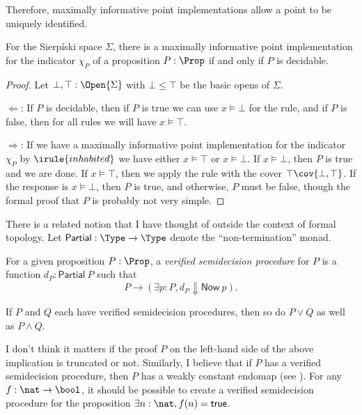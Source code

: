 Therefore, maximally informative point implementations allow a point to be uniquely identified.
\begin{theorem}
For the Sierpíski space $\Sigma$, there is a maximally informative point implementation for the indicator $\chi_P$ of a proposition $P : \Prop$ if and only if $P$ is decidable.
\end{theorem}
\begin{proof}
Let $\bot, \top : \Open{\Sigma}$ with $\bot \le \top$ be the basic opens of $\Sigma$. 

$\Longleftarrow$: If $P$ is decidable, then if $P$ is true we can use $x \models \bot$ for the  rule, and if $P$ is false, then for all rules we will have $x \models \top$.

$\Longrightarrow$: If we have a maximally informative point implementation for the indicator $\chi_P$ by $\irule{inhabited}$ we have either $x \models \top$ or $x \models \bot$. If $x \models \bot$, then $P$ is true and we are done. If $x \models \top$, then we apply the  rule with the cover $\top \cov \{ \bot, \top \}$. If the response is $x \models \bot$, then $P$ is true, and otherwise, $P$ must be false, though the formal proof that $P$ is probably not very simple.
\end{proof}

There is a related notion that I have thought of outside the context of formal topology. Let $\mathsf{Partial} : \Type \to \Type$ denote the ``non-termination'' monad. 
\begin{definition}
For a given proposition $P : \Prop$, a \emph{verified semidecision procedure} for $P$ is a function $d_P : \mathsf{Partial}\ P$ such that
\[
P \to (\exists p : P, d_P \Downarrow \mathsf{Now}\ p).
\]
\end{definition}

\begin{claim}
If $P$ and $Q$ each have verified semidecision procedures, then so do $P \vee Q$ as well as $P \wedge Q$.
\end{claim}

I don't think it matters if the proof $P$ on the left-hand side of the above implication is truncated or not. Similarly, I believe that if $P$ has a verified semidecision procedure, then $P$ has a weakly constant endomap (see \cite{kraus2014}). For any $f : \nat \to \bool$, it should be possible to create a verified semidecision procedure for the proposition $\exists n : \nat, f(n) = \mathsf{true}$.

